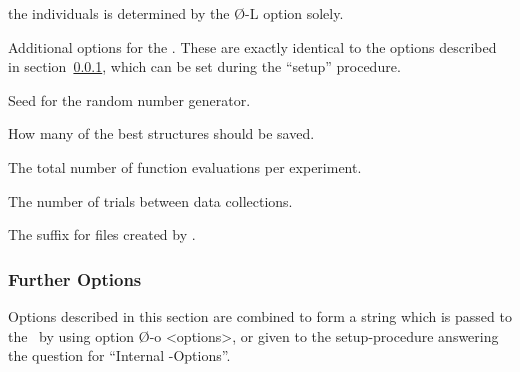 \begin{Enumerate}
	the individuals is determined by the \O{-L} option solely.
%
\ifUS
\item	{}
	\vspace*{-1.0\baselineskip}
	\baselineskip
\else
\item	{}
\fi
	Additional options for the \GA.
	These are exactly identical to the options described in 
	section~\ref{genesis-subsubfurther}, which can be set during 
	the ``setup'' procedure.
%
\item	{}
	Seed for the random number generator.
%
\item	{}
	How many of the best structures should be saved.
%
\item	{}
	The total number of function evaluations per experiment.
%
\item	{}
	The number of trials between data collections.
%
\item	{}
	The suffix for files created by \GEN.	
%
\end{Enumerate}

\subsubsection{Further Options}\label{genesis-subsubfurther}

Options described in this section are combined to form a string which is
passed to the \GA\ by using option \O{-o <options>}, or given to the 
setup-procedure answering the question for ``Internal \GA-Options''.

